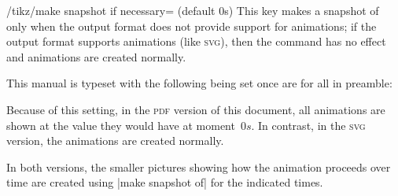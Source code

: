\begin{key}{/tikz/make snapshot if necessary= (default 0s)}
  This key makes a snapshot of  only when the output format
  does not provide support for animations; if the output format
  supports animations (like \textsc{svg}), then the command has
  no effect and animations are created normally.

  This manual is typeset with the following being set once are for all
  in preamble:
\begin{codeexample}
\tikzset{make snapshot if necessary}    
\end{codeexample}

  Because of this setting, in the \textsc{pdf} version of this
  document, all animations are shown at the value they would have at
  moment~$0s$. In contrast, in the \textsc{svg} version, the
  animations are created normally.

  In both versions, the smaller pictures showing how the animation
  proceeds over time are created using |make snapshot of| for the
  indicated times.
\end{key}



\endinput




